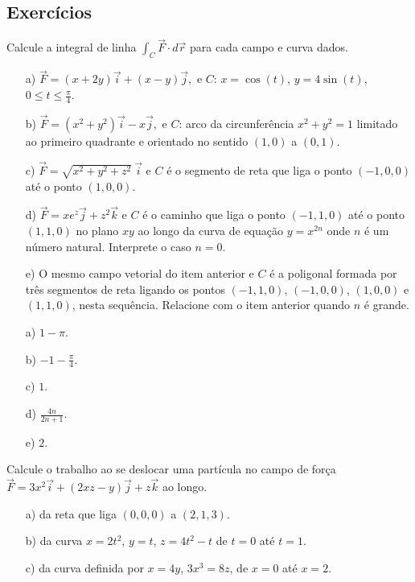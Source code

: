 \subsection*{Exercícios}
\begin{exer}Calcule a integral de linha $\int_C\vec{F}\cdot d\vec{r}$ para cada campo e curva dados.
\begin{itemize}
 \item[a)] $\vec{F}=(x+2y)\vec{i}+(x-y)\vec{j},$ e $C$: $x=\cos(t)$, $y=4\sin(t)$, $0\leq t\leq \frac{\pi}{4}$.
 \item[b)] $\vec{F}=(x^2+y^2)\vec{i}-x\vec{j},$ e $C$: arco da circunferência $x^2+y^2=1$ limitado ao primeiro quadrante e orientado no sentido $(1,0)$ a $(0,1)$.
 \item[c)] $\vec{F}=\sqrt{x^2+y^2+z^2}\!~\vec{i}$ e $C$ é o segmento de reta que liga o ponto $(-1, 0, 0)$ até o ponto $(1,0,0)$.
 \item[d)]  $\vec{F}= xe^z\vec{j} + z^2\vec{k}$ e $C$ é o caminho que liga o ponto $(-1,1,0)$ até o ponto $(1,1,0)$ no plano $xy$  ao longo da curva de equação $y=x^{2n}$ onde $n$ é um número natural. Interprete o caso $n=0$.
 \item[e)] O mesmo campo vetorial do item anterior e $C$ é a poligonal formada por três segmentos de reta ligando os pontos $(-1,1,0)$,  $(-1,0,0)$, $(1,0,0)$ e $(1,1,0)$, nesta sequência. Relacione com o item anterior quando $n$ é grande.
 \end{itemize}
\end{exer}
\begin{resp}
 \begin{itemize}
  \item[a)] $1-\pi$.
  \item[b)] $-1-\frac{\pi}{4}$.
  \item[c)] $1$.
  \item[d)] $\frac{4n}{2n+1}$.
  \item[e)] $2$. 
 \end{itemize}
\end{resp}
\begin{exer}
 Calcule o trabalho ao se deslocar uma partícula no campo de força $\vec{F}=3x^2\vec{i}+(2xz-y)\vec{j}+z\vec{k}$ ao longo.
 \begin{itemize}
  \item[a)] da reta que liga $(0,0,0)$ a $(2,1,3)$. 
  \item[b)] da curva $x=2t^2$, $y=t$, $z=4t^2-t$ de $t=0$ até $t=1$.
  \item[c)] da curva definida por $x=4y$, $3x^3=8z$, de $x=0$ até $x=2$.
 \end{itemize}
 \end{exer}
